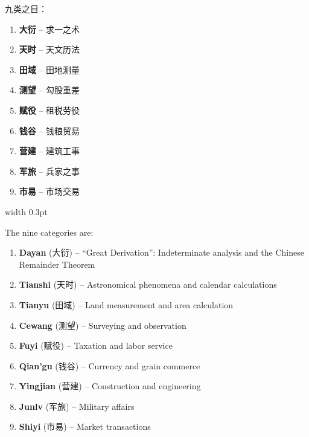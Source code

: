 \documentclass[10pt,a4paper]{article}
\begin{document}
\noindent\begin{minipage}[t]{0.47\textwidth}
\begin{flushleft}
\small
九类之目：
\begin{enumerate}[label=\arabic*.,leftmargin=*,nosep,topsep=2pt]
  \item \textbf{大衍} -- 求一之术
  \item \textbf{天时} -- 天文历法
  \item \textbf{田域} -- 田地测量
  \item \textbf{测望} -- 勾股重差
  \item \textbf{赋役} -- 租税劳役
  \item \textbf{钱谷} -- 钱粮贸易
  \item \textbf{营建} -- 建筑工事
  \item \textbf{军旅} -- 兵家之事
  \item \textbf{市易} -- 市场交易
\end{enumerate}
\end{flushleft}
\end{minipage}%
\hfill\vrule width 0.3pt\hfill%
\begin{minipage}[t]{0.47\textwidth}
\begin{flushleft}
\small
The nine categories are:
\begin{enumerate}[label=\arabic*.,leftmargin=*,nosep,topsep=2pt]
  \item \textbf{Dayan} (大衍) -- ``Great Derivation'': Indeterminate analysis and the Chinese Remainder Theorem
  \item \textbf{Tianshi} (天时) -- Astronomical phenomena and calendar calculations
  \item \textbf{Tianyu} (田域) -- Land measurement and area calculation
  \item \textbf{Cewang} (测望) -- Surveying and observation
  \item \textbf{Fuyi} (赋役) -- Taxation and labor service
  \item \textbf{Qian'gu} (钱谷) -- Currency and grain commerce
  \item \textbf{Yingjian} (营建) -- Construction and engineering
  \item \textbf{Junlv} (军旅) -- Military affairs
  \item \textbf{Shiyi} (市易) -- Market transactions
\end{enumerate}
\end{flushleft}
\end{minipage}

\newpage
\end{document}

